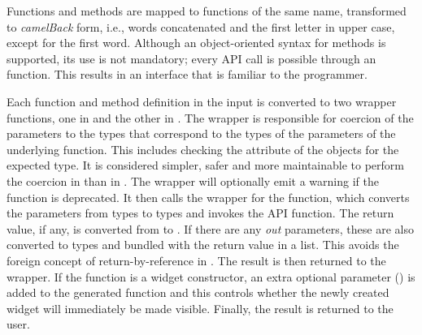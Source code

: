 \documentclass[article,shortnames]{jss}
\begin{document}
Functions and methods are mapped to  functions of the same
name, transformed to \emph{camelBack} form, i.e., words concatenated
and the first letter in upper case, except for the first word.
Although an object-oriented syntax for methods is supported, its use
is not mandatory; every API call is possible through an 
function. This results in an interface that is familiar to the
 programmer. 

Each function and method definition in the
 input is converted to two wrapper functions, one in
 and the other in .  The  wrapper
is responsible for coercion of the parameters to the 
types that correspond to the  types of the parameters of
the underlying  function. This includes checking the
 attribute of the  objects for the
expected type.  It is considered simpler, safer and more maintainable
to perform the coercion in  than in . The
 wrapper will optionally emit a warning if the function is
deprecated.  It then calls the  wrapper for the function,
which converts the parameters from  types to 
types and invokes the API function. The return value, if any, is
converted from  to . If there are any
\emph{out} parameters, these are also converted to  types
and bundled with the return value in a list. This avoids the foreign
concept of return-by-reference in . The result is then
returned to the  wrapper. If the function is a widget
constructor, an extra optional parameter () is added to the
generated  function and this controls whether the newly
created widget will immediately be made visible. Finally, the result
is returned to the user.
\end{document}
